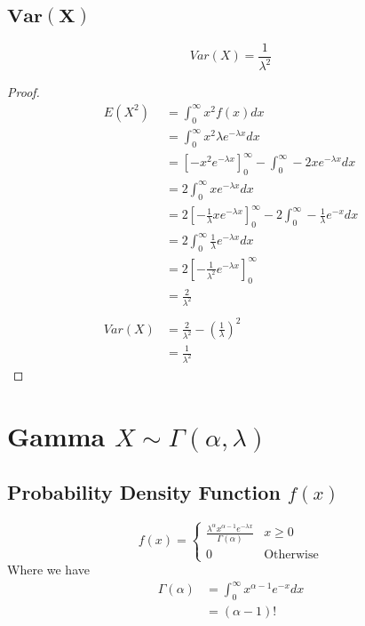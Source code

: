 \documentclass[12pt]{article}
\begin{document}
\subsection{$\bm{Var(X)}$}

\begin{equation*}
  Var(X)= \frac{1}{\lambda^{2}}
\end{equation*}
\begin{proof}
  \begin{align*}
    E(X^{2}) &= \int_{0}^{\infty} x^{2} f(x) dx \\
             &= \int_{0}^{\infty} x^{2} \lambda e^{-\lambda x} dx \\
             &= \left[-x^{2}e^{-\lambda x} \right]_{0}^{\infty} - \int_{0}^{\infty}-2x e^{-\lambda x} dx \\
             &= 2\int_{0}^{\infty} xe^{-\lambda x} dx \\
             &= 2\left[-\frac{1}{\lambda}xe^{-\lambda x} \right]_{0}^{\infty} -2 \int_{0}^{\infty}-\frac{1}{\lambda}e^{-x} dx \\
             &= 2\int_{0}^{\infty} \frac{1}{\lambda}e^{-\lambda x} dx \\
             &= 2\left[-\frac{1}{\lambda^{2}}e^{-\lambda x} \right]_{0}^{\infty} \\
             &= \frac{2}{\lambda^{2}} \\ \\
    Var(X) &= \frac{2}{\lambda^{2}} - \left(\frac{1}{\lambda}\right)^{2} \\
           &= \frac{1}{\lambda^{2}}
  \end{align*}
\end{proof}
\newpage
\section{Gamma $X \sim \Gamma(\alpha,\lambda)$}
\subsection{Probability Density Function $f(x)$}

\begin{equation*}
  f(x) =
  \begin{cases}
     \frac{\lambda^{\alpha} x^{\alpha -1} e^{-\lambda x}}{\Gamma(\alpha)} & x \geq 0 \\
     0 & \text{Otherwise}
  \end{cases}
\end{equation*}
Where we have
\begin{align*}
  \Gamma(\alpha) &= \int_{0}^{\infty}x^{\alpha -1}e^{-x} dx \\
                 &= (\alpha -1)!
\end{align*}
\end{document}

